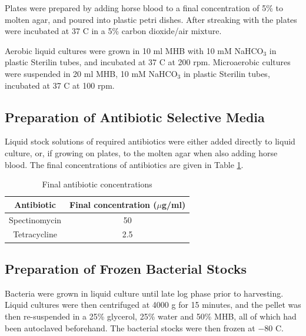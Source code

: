 Plates were prepared by adding horse blood to a final concentration of 5\% to molten agar, and poured into plastic petri dishes. After streaking with \Nm{} the plates were incubated at 37 \textdegree C in a 5\% carbon dioxide/air mixture.

Aerobic liquid cultures were grown in 10 ml MHB with 10 mM NaHCO$_\textrm{3}$ in plastic Sterilin tubes, and incubated at 37 \textdegree C at 200 rpm. Microaerobic cultures were suspended in 20 ml MHB, 10 mM NaHCO$_\textrm{3}$ in plastic Sterilin tubes, incubated at 37 \textdegree C at 100 rpm.

\subsection{Preparation of Antibiotic Selective Media}
Liquid stock solutions of required antibiotics were either added directly to liquid culture, or, if growing on plates, to the molten agar when also adding horse blood. The final concentrations of antibiotics are given in Table \ref{tab:antibiotic-concs}.

\begin{table}[here]%
\begin{center}
\begin{tabular}{cc}
\toprule
\textbf{Antibiotic} & \textbf{Final concentration ($\mu$g/ml)} \\
\midrule
Spectinomycin & 50 \\
Tetracycline & 2.5 \\
\bottomrule
\end{tabular}
\end{center}
\caption{Final antibiotic concentrations
\label{tab:antibiotic-concs}}
\end{table}

\subsection{Preparation of Frozen Bacterial Stocks}
Bacteria were grown in liquid culture until late log phase prior to harvesting. Liquid cultures were then centrifuged at 4000 g for 15 minutes, and the pellet was then re-suspended in a 25\% glycerol, 25\% water and 50\% MHB, all of which had been autoclaved beforehand. The bacterial stocks were then frozen at $-80$ \textdegree C.

